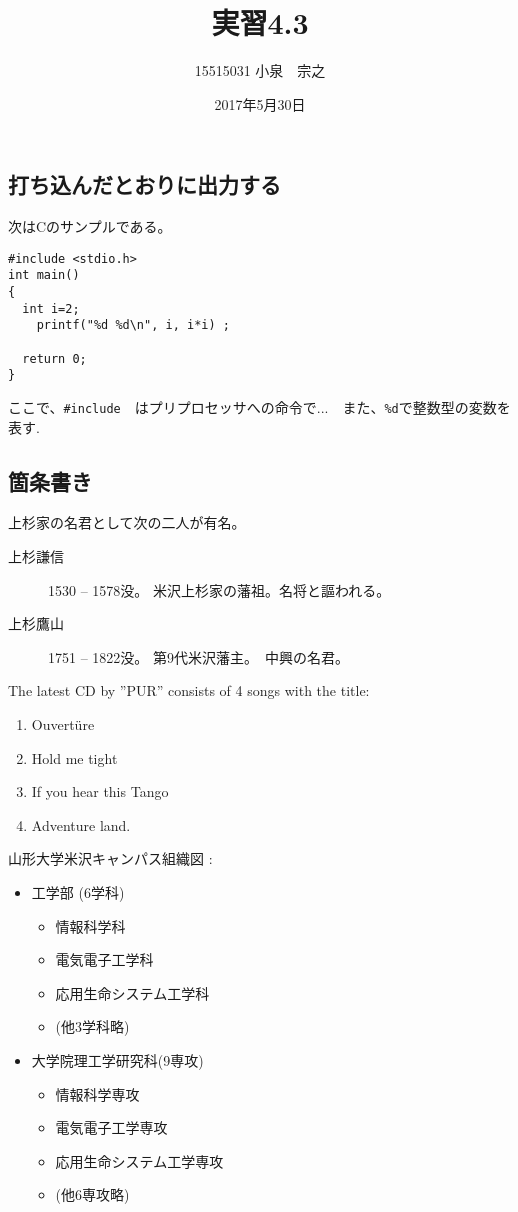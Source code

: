 \documentclass[12pt,a4j]{jarticle}
\title{実習4.3}
\author{15515031 小泉　宗之}
\date{2017年5月30日}
\begin{document}
\maketitle

\subsection{打ち込んだとおりに出力する}
次はCのサンプルである。
\begin{verbatim}
#include <stdio.h>
int main()
{
  int i=2;
    printf("%d %d\n", i, i*i) ;

  return 0;
}
\end{verbatim}
ここで、\verb|#include|　はプリプロセッサへの命令で...　また、\verb+%d+で整数型の変数を表す.

\subsection{箇条書き}
上杉家の名君として次の二人が有名。
\begin{description}
\item[上杉謙信] 1530 -- 1578没。
米沢上杉家の藩祖。名将と謳われる。
\item[上杉鷹山] 1751 -- 1822没。
第9代米沢藩主。　中興の名君。
\end{description}

The latest CD by ''PUR'' consists of 4 songs with the title:
\begin{enumerate}
\item Ouvert\"ure
\item Hold me tight
\item If you hear this Tango
\item Adventure land.
\end{enumerate}

山形大学米沢キャンパス組織図 :
\begin{itemize}
\item 工学部 (6学科)
 \begin{itemize}
 \item 情報科学科
 \item 電気電子工学科
 \item 応用生命システム工学科
 \item (他3学科略)
 \end{itemize}
\item 大学院理工学研究科(9専攻)
 \begin{itemize}
 \item 情報科学専攻
 \item 電気電子工学専攻
 \item 応用生命システム工学専攻
 \item (他6専攻略)
 \end{itemize}
\end{itemize}
\end{document}
